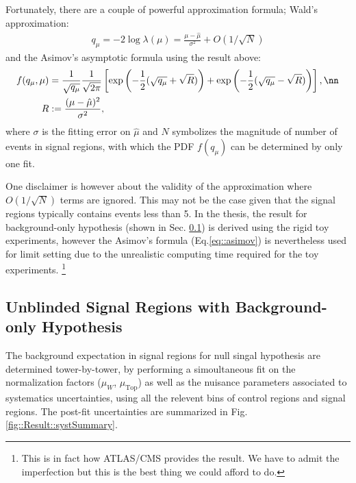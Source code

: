 Fortunately, there are a couple of powerful approximation formula; Wald's approximation:
\begin{align}
q_\mu = -2 \log\lambda(\mu) = \frac{\mu-\hat{\mu}}{\sigma^2} + O(1/\sqrt{N})
\end{align}
and the Asimov's asymptotic formula using the result above:
\begin{align}
f(q_\mu,\mu) & = \frac{1}{\sqrt{q_\mu}} \frac{1}{\sqrt{2\pi}} \left[ \exp \left( -\frac{1}{2}(\sqrt{q_\mu}+\sqrt{R}) \right) + \exp \left( -\frac{1}{2}(\sqrt{q_\mu}-\sqrt{R}) \right) \right], \nn \\
R & := \frac{(\mu-\hat{\mu})^2}{\sigma^2},
\label{eq::asimov}
\end{align}
where $\sigma$ is the fitting error on $\hat{\mu}$ and $N$ symbolizes the magnitude of number of events in signal regions, with which the PDF $f(q_\mu)$ can be determined by only one fit.

One disclaimer is however about the validity of the approximation where $O(1/\sqrt{N})$ terms are ignored.
This may not be the case given that the signal regions typically contains events less than 5.
In the thesis, the result for background-only hypothesis (shown in Sec. \ref{sed::Result::bgOnly}) is derived using the rigid toy experiments, however the Asimov's formula (Eq.\ref{eq::asimov}) is nevertheless used for limit setting due to the unrealistic computing time required for the toy experiments. 
\footnote{This is in fact how ATLAS/CMS provides the result. We have to admit the imperfection but this is the best thing we could afford to do.}


\clearpage
\subsection{Unblinded Signal Regions with Background-only Hypothesis} \label{sed::Result::bgOnly}
The background expectation in signal regions for null singal hypothesis are determined tower-by-tower, 
by performing a simoultaneous fit on the normalization factors ($\mu_W$, $\mu_{\mathrm{Top}}$) as well as the nuisance parameters associated to systematics uncertainties, 
using all the relevent bins of control regions and signal regions.
The post-fit uncertainties are summarized in Fig. \ref{fig::Result::systSummary}.  \\

